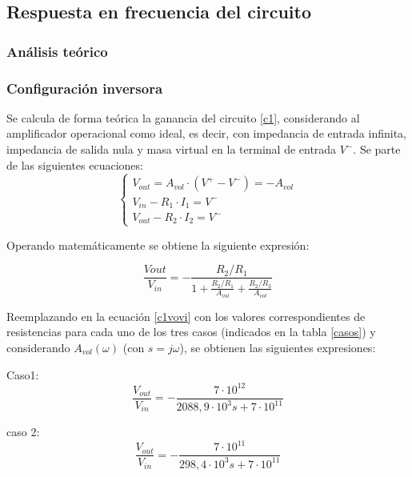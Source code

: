 \subsection{Respuesta en frecuencia del circuito}

\subsubsection{An\'alisis te\'orico} %

\subsubsection*{Configuraci\'on inversora}
Se calcula de forma te\'orica la ganancia del circuito \ref{c1}, considerando al amplificador operacional como ideal, es decir, con impedancia de entrada infinita, impedancia de salida nula y masa virtual en la terminal de entrada $V^{-}$. Se parte de las siguientes ecuaciones:
\begin{equation}
	\begin{cases}
		V_{out} = A_{vol}\cdot(V^+ - V^-) = -A_{vol}\\
		V_{in} - R_1 \cdot I_1 = V^- \\
		V_{out} - R_2 \cdot I_2 = V^- 
	\end{cases}
	\label{ecsbase}
\end{equation}

Operando matem\'aticamente se obtiene la siguiente expresi\'on:

\begin{equation}
	\frac{V{out}}{V_{in}} = - \frac{R_2/R_1}{1 + \frac{R_2/R_1}{A_{vol}} + \frac{R_2/R_3}{A_{vol}}}
	\label{c1vovi}
\end{equation}

Reemplazando en la ecuaci\'on \ref{c1vovi} con los valores correspondientes de resistencias para cada uno de los tres casos (indicados en la tabla \ref{casos}) y  considerando $A_{vol}(\omega)$ (con $s = j\omega$), se obtienen las siguientes expresiones:

Caso1:
\begin{equation}
	\frac{V_{out}}{V_{in}} = - \frac{7\cdot10^{12}}{2088,9 \cdot 10^3 s + 7 \cdot 10^{11}}
	\label{c1c1vovi}
\end{equation}

caso 2:
\begin{equation}
	\frac{V_{out}}{V_{in}} = - \frac{7 \cdot 10^{11}}{298,4 \cdot 10^{3} s +7 \cdot 10^{11}}
	\label{c1c2vovi}
\end{equation}

